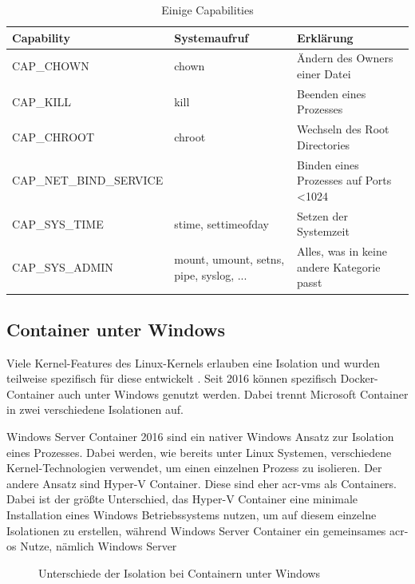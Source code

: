 \begin{table}[h]
	\begin{center}
		\begin{tabular}{lp{3cm}p{4cm}}
			\toprule
			Capability 		& Systemaufruf 			& Erklärung						\\
			\midrule
			CAP\_CHOWN 		& chown 				& Ändern des Owners einer Datei \\
			CAP\_KILL 		& kill 					& Beenden eines Prozesses		\\
			CAP\_CHROOT		& chroot				& Wechseln des Root Directories	\\
			\midrule
			CAP\_NET\_BIND\_SERVICE & & Binden eines Prozesses auf Ports \textless 1024 \\
			\midrule
			CAP\_SYS\_TIME	& stime, settimeofday	& Setzen der Systemzeit 		\\
			CAP\_SYS\_ADMIN	& mount, umount, setns, pipe, syslog, ... 	& Alles, was in keine andere Kategorie passt 														\\
			\bottomrule
		\end{tabular}
	\end{center}
	\caption{Einige Capabilities \citep{Capabilities7LinuxManualPage}}
	\label{tab:capabilities}
\end{table}

\subsection{Container unter Windows}
\label{sec:windows}
Viele Kernel-Features des Linux-Kernels erlauben eine Isolation und wurden teilweise spezifisch für diese entwickelt \citep{Namespaces7LinuxManualPage}. Seit 2016 können spezifisch Docker-Container auch unter Windows genutzt werden. Dabei trennt Microsoft Container in zwei verschiedene Isolationen auf.

Windows Server Container 2016 sind ein nativer Windows Ansatz zur Isolation eines Prozesses. Dabei werden, wie bereits unter Linux Systemen, verschiedene Kernel-Technologien verwendet, um einen einzelnen Prozess zu isolieren. Der andere Ansatz sind Hyper-V Container. Diese sind eher \glspl{acr-vm} als Containers. Dabei ist der größte Unterschied, das Hyper-V Container eine minimale Installation eines Windows Betriebssystems nutzen, um auf diesem einzelne Isolationen zu erstellen, während Windows Server Container ein gemeinsames \gls{acr-os} Nutze, nämlich Windows Server

\begin{figure}[h]
	\caption{Unterschiede der Isolation bei Containern unter Windows}
	\label{fig:hypervVSwinserver}
\end{figure}

